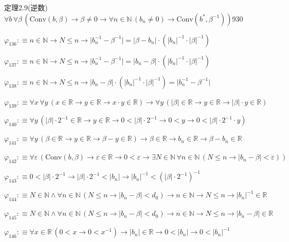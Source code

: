 \begin{fullproof}{定理2.9(逆数)}{$\forall b\,\forall \beta\,(\mathrm{Conv}(b,\beta) \to \beta \neq 0 \to \forall n \in \mathbb{N}\,(b_{n} \neq 0) \to \mathrm{Conv}(b^{\ast},\beta^{-1}))$}{930}
\begin{abbrevlist}
\item $\varphi_{136} :\equiv n \in \mathbb{N} \to N \leq n \to \lvert b_{n}^{-1} - \beta^{-1} \rvert = \lvert \beta - b_{n} \rvert \cdot (\lvert b_{n} \rvert^{-1} \cdot \lvert \beta \rvert^{-1})$
\item $\varphi_{137} :\equiv n \in \mathbb{N} \to N \leq n \to \lvert b_{n}^{-1} - \beta^{-1} \rvert = \lvert b_{n} - \beta \rvert \cdot (\lvert b_{n} \rvert^{-1} \cdot \lvert \beta \rvert^{-1})$
\item $\varphi_{138} :\equiv n \in \mathbb{N} \to N \leq n \to \lvert b_{n} - \beta \rvert \cdot (\lvert b_{n} \rvert^{-1} \cdot \lvert \beta \rvert^{-1}) = \lvert b_{n}^{-1} - \beta^{-1} \rvert$
\item $\varphi_{139} :\equiv \forall x\,\forall y\,(x \in \mathbb{R} \to y \in \mathbb{R} \to x \cdot y \in \mathbb{R}) \to \forall y\,(\lvert \beta \rvert \in \mathbb{R} \to y \in \mathbb{R} \to \lvert \beta \rvert \cdot y \in \mathbb{R})$
\item $\varphi_{140} :\equiv \forall y\,(\lvert \beta \rvert \cdot 2^{-1} \in \mathbb{R} \to y \in \mathbb{R} \to 0 < \lvert \beta \rvert \cdot 2^{-1} \to 0 < y \to 0 < \lvert \beta \rvert \cdot 2^{-1} \cdot y)$
\item $\varphi_{141} :\equiv \forall y\,(\beta \in \mathbb{R} \to y \in \mathbb{R} \to \beta - y \in \mathbb{R}) \to \beta \in \mathbb{R} \to b_{n} \in \mathbb{R} \to \beta - b_{n} \in \mathbb{R}$
\item $\varphi_{142} :\equiv \forall \varepsilon\,(\mathrm{Conv}(b,\beta) \to \varepsilon \in \mathbb{R} \to 0 < \varepsilon \to \exists N \in \mathbb{N}\,\forall n \in \mathbb{N}\,(N \leq n \to \lvert b_{n} - \beta \rvert < \varepsilon))$
\item $\varphi_{143} :\equiv 0 < \lvert \beta \rvert \cdot 2^{-1} \to \lvert \beta \rvert \cdot 2^{-1} < \lvert b_{n} \rvert \to \lvert b_{n} \rvert^{-1} < (\lvert \beta \rvert \cdot 2^{-1})^{-1}$
\item $\varphi_{144} :\equiv N \in \mathbb{N} \land \forall n \in \mathbb{N}\,(N \leq n \to \lvert b_{n} - \beta \rvert < d_{0}) \to n \in \mathbb{N} \to N \leq n \to \lvert b_{n} \rvert^{-1} \in \mathbb{R}$
\item $\varphi_{145} :\equiv N \in \mathbb{N} \land \forall n \in \mathbb{N}\,(N \leq n \to \lvert b_{n} - \beta \rvert < d_{0}) \to n \in \mathbb{N} \to N \leq n \to \lvert b_{n} - \beta \rvert \in \mathbb{R}$
\item $\varphi_{146} :\equiv \forall x \in \mathbb{R}\,(0 < x \to 0 < x^{-1}) \to \lvert b_{n} \rvert \in \mathbb{R} \to 0 < \lvert b_{n} \rvert \to 0 < \lvert b_{n} \rvert^{-1}$

\end{abbrevlist}
\end{fullproof}
